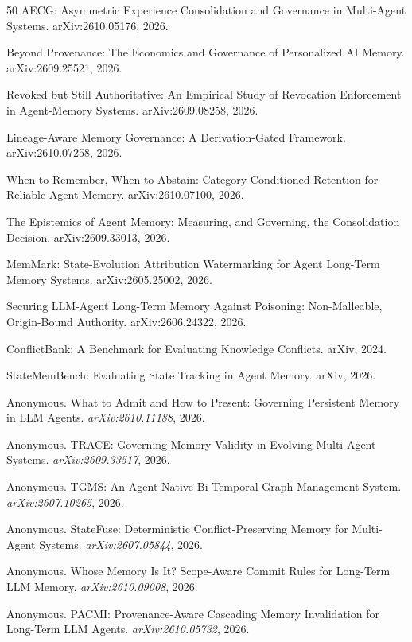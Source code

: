 \documentclass{article}
\begin{document}
\begin{thebibliography}{50}
 AECG: Asymmetric Experience Consolidation and Governance in Multi-Agent Systems. arXiv:2610.05176, 2026.

 Beyond Provenance: The Economics and Governance of Personalized AI Memory. arXiv:2609.25521, 2026.

 Revoked but Still Authoritative: An Empirical Study of Revocation Enforcement in Agent-Memory Systems. arXiv:2609.08258, 2026.

 Lineage-Aware Memory Governance: A Derivation-Gated Framework. arXiv:2610.07258, 2026.

 When to Remember, When to Abstain: Category-Conditioned Retention for Reliable Agent Memory. arXiv:2610.07100, 2026.

 The Epistemics of Agent Memory: Measuring, and Governing, the Consolidation Decision. arXiv:2609.33013, 2026.

 MemMark: State-Evolution Attribution Watermarking for Agent Long-Term Memory Systems. arXiv:2605.25002, 2026.

 Securing LLM-Agent Long-Term Memory Against Poisoning: Non-Malleable, Origin-Bound Authority. arXiv:2606.24322, 2026.

 ConflictBank: A Benchmark for Evaluating Knowledge Conflicts. arXiv, 2024.

 StateMemBench: Evaluating State Tracking in Agent Memory. arXiv, 2026.


Anonymous.
\newblock What to Admit and How to Present: Governing Persistent Memory in LLM Agents.
\newblock \emph{arXiv:2610.11188}, 2026.

Anonymous.
\newblock TRACE: Governing Memory Validity in Evolving Multi-Agent Systems.
\newblock \emph{arXiv:2609.33517}, 2026.

Anonymous.
\newblock TGMS: An Agent-Native Bi-Temporal Graph Management System.
\newblock \emph{arXiv:2607.10265}, 2026.

Anonymous.
\newblock StateFuse: Deterministic Conflict-Preserving Memory for Multi-Agent Systems.
\newblock \emph{arXiv:2607.05844}, 2026.

Anonymous.
\newblock Whose Memory Is It? Scope-Aware Commit Rules for Long-Term LLM Memory.
\newblock \emph{arXiv:2610.09008}, 2026.

Anonymous.
\newblock PACMI: Provenance-Aware Cascading Memory Invalidation for Long-Term LLM Agents.
\newblock \emph{arXiv:2610.05732}, 2026.
\end{thebibliography}
\end{document}
